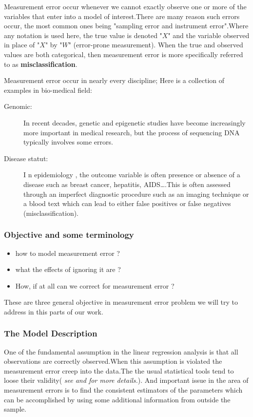 \documentclass[12pt]{report}
\begin{document}
Measurement error occur whenever we cannot exactly observe one or more of the variables that enter into a model of interest.There are many reason such errors occur, the most common ones being "sampling error and instrument error".Where any notation is used here, the true value is denoted "$X$" and the variable observed in place of "$X$" by "$W$" (error-prone measurement). When the true and observed values are both categorical, then measurement error is more specifically referred to as \textbf{misclassification}.

Measurement error occur in nearly every discipline; Here is a collection of examples in bio-medical field:
\begin{description}
	\item[Genomic:] In recent decades, genetic and epigenetic studies have become increasingly more important in medical research, but the process of sequencing DNA typically involves some errors.
	\item[Disease statut:] I n epidemiology , the outcome variable is often presence or absence of a disease such as breast cancer, hepatitis, AIDS\dots .This is often assessed through an imperfect diagnostic procedure such as an imaging technique or a blood text which can lead to either false positives or false negatives (misclassification).
\end{description}
\subsubsection{Objective and some terminology}
\label{spc}

\begin{itemize}
	\item how to model measurement error ?
	\item what the effects of ignoring it are ?
	\item How, if at all can we correct for measurement error ?
\end{itemize}
These are three general objective in measurement error problem we will try to address in this parts of our work.
\subsubsection{The Model Description}  
One of the fundamental assumption in the linear regression analysis is that all observations are correctly observed.When this assumption is violated the measurement error creep into the data.The the usual statistical tools tend to loose their validity( \textit{see \cite{nref2} and \cite{nref3} for more details.}). And important issue in the area of measurement errors is to find the consistent estimators of the parameters which can be accomplished by using some additional information from outside the sample.
\end{document}
